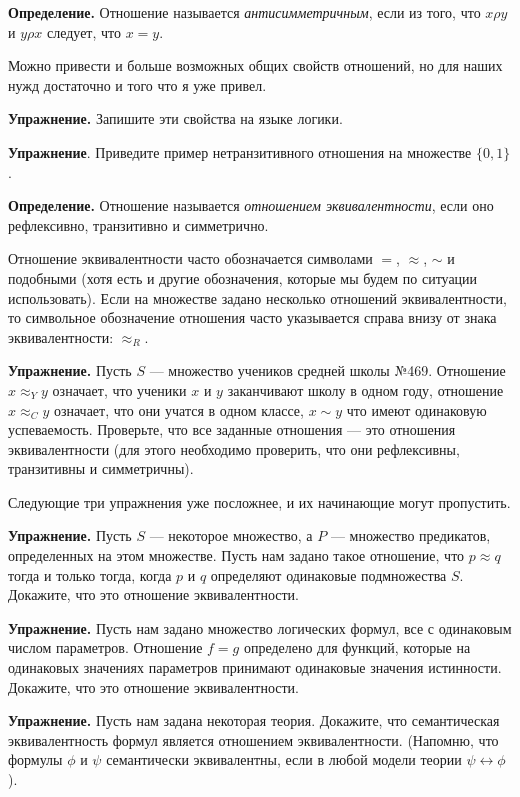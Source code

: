 {\bfseries Определение.} Отношение называется {\slshape антисимметричным}, если из того, что $x \rho y$ и $y \rho x$ следует, что $x = y$.

Можно привести и больше возможных общих свойств отношений, но для наших нужд достаточно и того что я уже привел.

{\bfseries Упражнение.} Запишите эти свойства на языке логики.

{\bfseries Упражнение}. Приведите пример нетранзитивного отношения на множестве $\{0, 1\}$.

{\bfseries Определение.} Отношение называется {\slshape отношением эквивалентности}, если оно рефлексивно, транзитивно и симметрично.

Отношение эквивалентности часто обозначается символами $=$, $\approx$, $\sim$ и подобными (хотя есть и другие обозначения, которые мы будем по ситуации использовать). Если на множестве задано несколько отношений эквивалентности, то символьное обозначение отношения часто указывается справа внизу от знака эквивалентности: $\approx_R$.

{\bfseries Упражнение.} Пусть $S$ — множество учеников средней школы №469. Отношение $x\approx_Y y$ означает, что ученики $x$ и $y$ заканчивают школу в одном году, отношение $x \approx_C y$ означает, что они учатся в одном классе, $x \sim y$ что имеют одинаковую успеваемость. Проверьте, что все заданные отношения — это отношения эквивалентности (для этого необходимо проверить, что они рефлексивны, транзитивны и симметричны).

Следующие три упражнения уже посложнее, и их начинающие могут пропустить.

{\bfseries Упражнение.} Пусть $S$ — некоторое множество, а $P$ — множество предикатов, определенных на этом множестве. Пусть нам задано такое отношение, что $p \approx q$ тогда и только тогда, когда $p$ и $q$ определяют одинаковые подмножества $S$. Докажите, что это отношение эквивалентности.

{\bfseries Упражнение.} Пусть нам задано множество логических формул, все с одинаковым числом параметров. Отношение $f=g$ определено для функций, которые на одинаковых значениях параметров принимают одинаковые значения истинности. Докажите, что это отношение эквивалентности.

{\bfseries Упражнение.} Пусть нам задана некоторая теория. Докажите, что семантическая эквивалентность формул является отношением эквивалентности. (Напомню, что формулы $\phi$ и $\psi$ семантически эквивалентны, если в любой модели теории $\psi\leftrightarrow\phi$).

